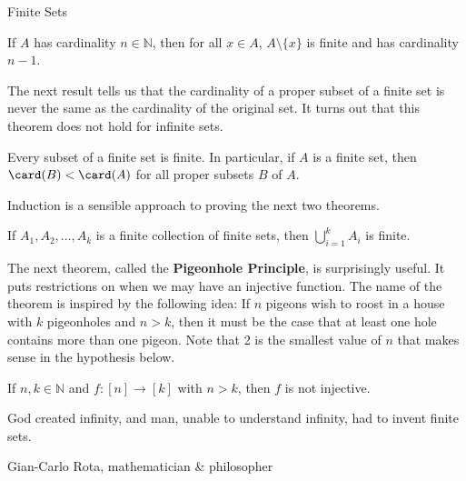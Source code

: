 \begin{section}{Finite Sets}
\begin{theorem}\label{thm:decreaseCardinality}
If $A$ has cardinality $n\in\mathbb{N}$, then for all $x\in A$, $A\setminus \{x\}$ is finite and has cardinality $n-1$. 
\end{theorem}

The next result tells us that the cardinality of a proper subset of a finite set is never the same as the cardinality of the original set.  It turns out that this theorem does not hold for infinite sets. 

\begin{theorem}\label{thm:cardinalityProperSubsetsFinite}
Every subset of a finite set is finite. In particular, if $A$ is a finite set, then $\card(B)<\card(A)$ for all proper subsets $B$ of $A$.
\end{theorem}

Induction is a sensible approach to proving the next two theorems.

\begin{theorem}
If $A_1,A_2,\ldots, A_k$ is a finite collection of finite sets, then $\displaystyle \bigcup_{i=1}^k A_i$ is finite.
\end{theorem}

The next theorem, called the \textbf{Pigeonhole Principle}, is surprisingly useful. It puts restrictions on when we may have an injective function. The name of the theorem is inspired by the following idea: If $n$ pigeons wish to roost in a house with $k$ pigeonholes and $n>k$, then it must be the case that at least one hole contains more than one pigeon.  Note that 2 is the smallest value of $n$ that makes sense in the hypothesis below.

\begin{theorem}
If $n,k\in\mathbb{N}$ and $f:[n]\to [k]$ with $n>k$, then $f$ is not injective.
\end{theorem}

\epigraph{God created infinity, and man, unable to understand infinity, had to invent finite sets.}{Gian-Carlo Rota, mathematician \& philosopher}

\end{section}